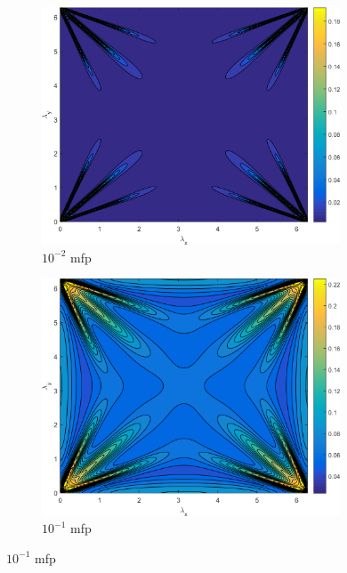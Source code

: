 \begin{figure}
\centering
	{
	\begin{subfigure}[b]{0.485\textwidth}
		\centering
		\includegraphics[width=0.975\textwidth]{figures/appendices/SI_M4S_UPWLD1_LS4_x=1e-2_dydx=1_contour.png}
		\caption{$10^{-2}$ mfp}
	\end{subfigure}
	\hfill
	\begin{subfigure}[b]{0.485\textwidth}
		\centering
		\includegraphics[width=0.975\textwidth]{figures/appendices/SI_M4S_UPWLD1_LS4_x=1e-1_dydx=1_contour.png}
		\caption{$10^{-1}$ mfp}
	\end{subfigure}
	}
	\vspace{0.5cm}

\end{figure}
